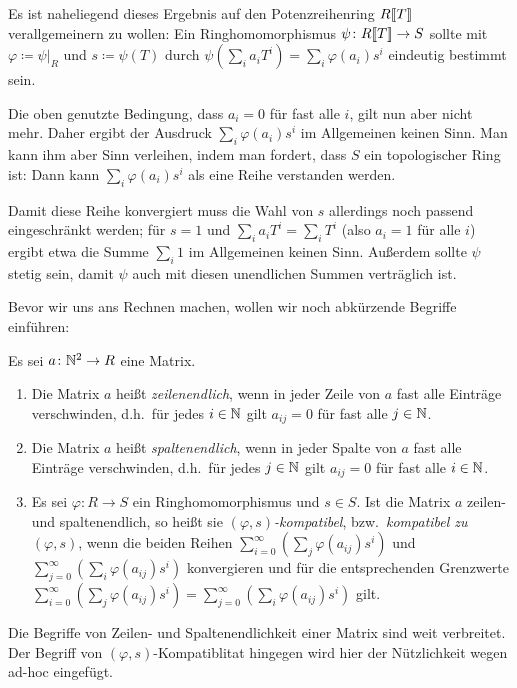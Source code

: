 \documentclass[a4paper, 10pt, numbers=noenddot]{scrartcl}
\begin{document}
Es ist naheliegend dieses Ergebnis auf den Potenzreihenring $R[\![T]\!]$ verallgemeinern zu  wollen:
Ein Ringhomomorphismus $\psi \colon R[\![T]\!] \to S$ sollte mit $\varphi \coloneqq \psi|_R$ und $s \coloneqq \psi(T)$ durch $\psi(\sum_i a_i T^i) = \sum_i \varphi(a_i) s^i$ eindeutig bestimmt sein.

Die oben genutzte Bedingung, dass $a_i = 0$ für fast alle $i$, gilt nun aber nicht mehr.
Daher ergibt der Ausdruck $\sum_i \varphi(a_i) s^i$ im Allgemeinen keinen Sinn.
Man kann ihm aber Sinn verleihen, indem man fordert, dass $S$ ein topologischer Ring ist:  
Dann kann $\sum_i \varphi(a_i) s^i$ als eine Reihe verstanden werden.

Damit diese Reihe konvergiert muss die Wahl von $s$ allerdings noch passend eingeschränkt werden;
für $s = 1$ und $\sum_i a_i T^i = \sum_i T^i$ (also $a_i = 1$ für alle $i$) ergibt etwa die Summe $\sum_i 1$ im Allgemeinen keinen Sinn.
Außerdem sollte $\psi$ stetig sein, damit $\psi$ auch mit diesen unendlichen Summen verträglich ist.

Bevor wir uns ans Rechnen machen, wollen wir noch abkürzende Begriffe einführen:

\begin{definition}
  Es sei $a \colon \mathbb{N}^2 \to R$ eine Matrix.
  \begin{enumerate}
    \item
      Die Matrix $a$ heißt \emph{zeilenendlich}, wenn in jeder Zeile von $a$ fast alle Einträge verschwinden, d.h.\ für jedes $i \in \mathbb{N}$ gilt $a_{ij} = 0$ für fast alle $j \in \mathbb{N}$.
    \item
      Die Matrix $a$ heißt \emph{spaltenendlich}, wenn in jeder Spalte von $a$ fast alle Einträge verschwinden, d.h.\ für jedes $j \in \mathbb{N}$ gilt $a_{ij} = 0$ für fast alle $i \in \mathbb{N}$.
    \item
      Es sei $\varphi \colon R \to S$ ein Ringhomomorphismus und $s \in S$.
      Ist die Matrix $a$ zeilen- und spaltenendlich, so heißt sie \emph{$(\varphi,s)$-kompatibel}, bzw.\ \emph{kompatibel zu $(\varphi,s)$}, wenn die beiden Reihen $\sum_{i=0}^\infty( \sum_j \varphi(a_{ij}) s^i )$ und $\sum_{j=0}^\infty( \sum_i \varphi(a_{ij}) s^i )$ konvergieren und für die entsprechenden Grenzwerte $\sum_{i=0}^\infty( \sum_j \varphi(a_{ij}) s^i ) = \sum_{j=0}^\infty( \sum_i \varphi(a_{ij}) s^i )$ gilt.
  \end{enumerate}
\end{definition}

\begin{remark}
  Die Begriffe von Zeilen- und Spaltenendlichkeit einer Matrix sind weit verbreitet.
  Der Begriff von $(\varphi, s)$-Kompatiblitat hingegen wird hier der Nützlichkeit wegen ad-hoc eingefügt.
\end{remark}
\end{document}

